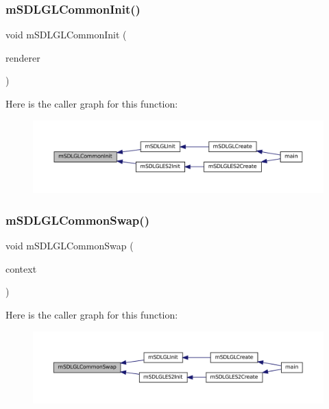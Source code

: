 \subsubsection{\texorpdfstring{m\+S\+D\+L\+G\+L\+Common\+Init()}{mSDLGLCommonInit()}}
{\footnotesize\ttfamily void m\+S\+D\+L\+G\+L\+Common\+Init (\begin{DoxyParamCaption}\item[{struct \mbox{\hyperlink{structm_s_d_l_renderer}{m\+S\+D\+L\+Renderer}} $\ast$}]{renderer }\end{DoxyParamCaption})}

Here is the caller graph for this function\+:
\nopagebreak
\begin{figure}[H]
\begin{center}
\leavevmode
\includegraphics[width=350pt]{gl-common_8c_a0e50f5587724b819f700b4e7efcec813_icgraph}
\end{center}
\end{figure}
\mbox{\label{gl-common_8c_ae4d176ceb2ea06fadb56334f1022586e}} 
\subsubsection{\texorpdfstring{m\+S\+D\+L\+G\+L\+Common\+Swap()}{mSDLGLCommonSwap()}}
{\footnotesize\ttfamily void m\+S\+D\+L\+G\+L\+Common\+Swap (\begin{DoxyParamCaption}\item[{struct \mbox{\hyperlink{struct_video_backend}{Video\+Backend}} $\ast$}]{context }\end{DoxyParamCaption})}

Here is the caller graph for this function\+:
\nopagebreak
\begin{figure}[H]
\begin{center}
\leavevmode
\includegraphics[width=350pt]{gl-common_8c_ae4d176ceb2ea06fadb56334f1022586e_icgraph}
\end{center}
\end{figure}
\mbox{\label{gl-common_8c_a3bdc1ec0c721ec01a7acf856d6370dd3}} 
